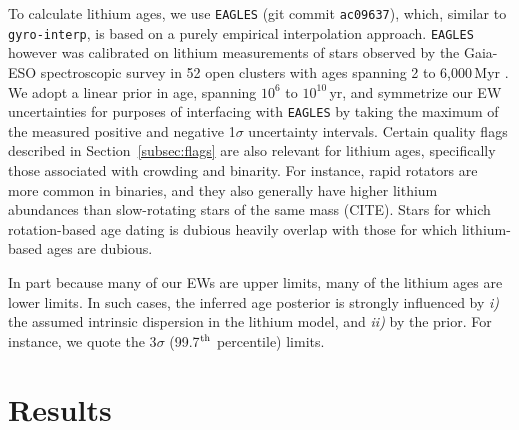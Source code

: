 \documentclass[11pt,twocolumn,tighten]{aastex63}
\begin{document}
To calculate lithium ages, we use \texttt{EAGLES} (git commit
\texttt{ac09637}), which, similar to
\texttt{gyro-interp}, is based on a purely empirical interpolation
approach.  \texttt{EAGLES} however was calibrated on lithium measurements of
stars observed by the
Gaia-ESO spectroscopic survey in 52 open clusters with ages spanning 2
to 6{,}000\,Myr \citep{Jeffries_2023}.  We adopt a linear prior in
age, spanning $10^6$ to $10^{10}$\,yr, and symmetrize our EW
uncertainties for purposes of interfacing with \texttt{EAGLES} by
taking the maximum of the measured positive and negative 1$\sigma$
uncertainty intervals.
Certain quality flags described in Section~\ref{subsec:flags} are also
relevant for lithium ages, specifically those associated with
crowding and binarity.
For instance, rapid rotators are more common in binaries, and they also
generally have higher lithium abundances than slow-rotating stars of the
same mass (CITE).
Stars for which rotation-based age dating is dubious heavily overlap
with those for which lithium-based ages are dubious.

In part because many of our EWs are upper limits, 
many of the lithium ages are lower limits.
In such cases,  the inferred age posterior is strongly influenced by
{\it i)} the assumed intrinsic dispersion in the lithium model,
and {\it ii)} by the prior.
For instance, 
 we quote the 3$\sigma$ (99.7$^{\rm th}$ percentile) limits.


\section{Results}
\label{sec:results}
\end{document}
